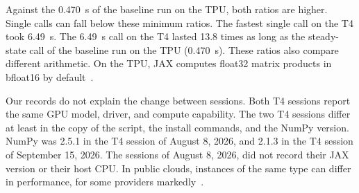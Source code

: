 Against the 0.470~s of the baseline run on the TPU, both ratios are higher. %
Single calls can fall below these minimum ratios.
The fastest single call on the T4 took 6.49~s. The 6.49~s call on the T4 lasted 13.8 times as long as the steady-state call of the baseline run on the TPU (0.470~s). %
These ratios also compare different arithmetic. On the TPU, JAX computes float32 matrix products in bfloat16 by
default~\cite{jaxmatmulprecision}.

Our records do not explain the change between sessions. Both T4 sessions report the same GPU model, driver, and
compute capability. The two T4 sessions differ at least in the copy of the script, the install commands, and the NumPy version.
NumPy was 2.5.1 in the T4 session of August 8, 2026, and 2.1.3 in the T4 session of September 15, 2026. %
The sessions of August 8, 2026, did not record their JAX version or their host CPU. In public clouds, instances of the same type can
differ in performance, for some providers markedly~\cite{leitner2016patterns}. %
